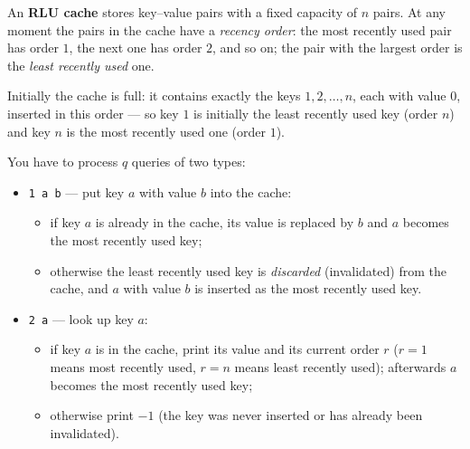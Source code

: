 An \textbf{RLU cache} stores key--value pairs with a fixed capacity of $n$ pairs. At any moment the pairs in the cache have a \emph{recency order}: the most recently used pair has order $1$, the next one has order $2$, and so on; the pair with the largest order is the \emph{least recently used} one.

Initially the cache is full: it contains exactly the keys $1, 2, \ldots, n$, each with value $0$, inserted in this order --- so key $1$ is initially the least recently used key (order $n$) and key $n$ is the most recently used one (order $1$).

You have to process $q$ queries of two types:

\begin{itemize}
  \item \texttt{1 a b} --- put key $a$ with value $b$ into the cache:
    \begin{itemize}
      \item if key $a$ is already in the cache, its value is replaced by $b$ and $a$ becomes the most recently used key;
      \item otherwise the least recently used key is \emph{discarded} (invalidated) from the cache, and $a$ with value $b$ is inserted as the most recently used key.
    \end{itemize}
  \item \texttt{2 a} --- look up key $a$:
    \begin{itemize}
      \item if key $a$ is in the cache, print its value and its current order $r$ ($r = 1$ means most recently used, $r = n$ means least recently used); afterwards $a$ becomes the most recently used key;
      \item otherwise print $-1$ (the key was never inserted or has already been invalidated).
    \end{itemize}
\end{itemize}
